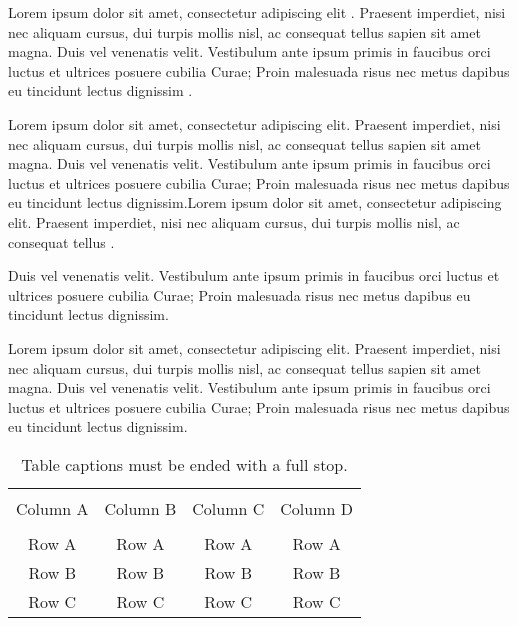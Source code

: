 Lorem ipsum dolor sit amet, consectetur adipiscing elit \cite{harper2007}. Praesent imperdiet, nisi nec aliquam cursus, dui turpis mollis nisl, ac consequat tellus sapien sit amet magna. Duis vel venenatis velit. Vestibulum ante ipsum primis in faucibus orci luctus et ultrices posuere cubilia Curae; Proin malesuada risus nec metus dapibus eu tincidunt lectus dignissim \cite{unesco}.

Lorem ipsum dolor sit amet, consectetur adipiscing elit. Praesent imperdiet, nisi nec aliquam cursus, dui turpis mollis nisl, ac consequat tellus sapien sit amet magna. Duis vel venenatis velit. Vestibulum ante ipsum primis in faucibus orci 
luctus et ultrices posuere cubilia Curae; Proin malesuada risus nec metus dapibus eu tincidunt lectus dignissim.Lorem ipsum dolor sit amet, consectetur adipiscing elit. Praesent imperdiet, nisi nec aliquam cursus, dui turpis mollis nisl, ac consequat tellus \cite{mccaffrey88,moore91,nelson88,sisaky,simpsondvd,startrek,TS-40561,url-1,url-2,vanden2001}.

Duis vel venenatis velit. Vestibulum ante ipsum primis in faucibus orci luctus et ultrices posuere cubilia Curae; Proin malesuada risus nec metus dapibus eu tincidunt lectus dignissim.

Lorem ipsum dolor sit amet, consectetur adipiscing elit. Praesent imperdiet, nisi nec aliquam cursus, dui turpis mollis nisl, ac consequat tellus sapien sit amet magna. Duis vel venenatis velit. Vestibulum ante ipsum primis in faucibus orci luctus et ultrices posuere cubilia Curae; Proin malesuada risus nec metus dapibus eu tincidunt lectus dignissim.

\begin{table*}[htp!]
	{\setlength{\tabcolsep}{14pt}
		\caption{Table captions must be ended with a full stop.}
		\begin{center}
			\vspace{-6mm}
			\begin{tabular}{cccc}
				\hline \\[-2.45ex] \hline \\[-2.1ex]
				Column A & Column B & Column C & Column D \\
				\hline \\[-2.1ex]
				Row A & Row A & Row A & Row A \\
				Row B & Row B & Row B & Row B \\
				Row C & Row C & Row C & Row C \\
				\hline
			\end{tabular}
			\vspace{-6mm}
		\end{center}
		\label{Table1.1}}
\end{table*}

